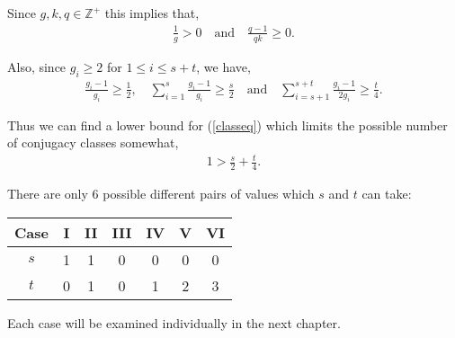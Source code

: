 Since $g,k,q \in \mathbb{Z}^+$ this implies that,
\begin{align*} \frac{1}{g} > 0 \quad \text{and} \quad \frac{q-1}{qk} \geq 0.
\end{align*} 

Also, since $g_i \geq 2$ for $1 \leq i \leq s + t$, we have,
\begin{align*} \frac{g_i-1}{g_i} \geq \frac{1}{2}, \quad \sum_{i=1}^{s} \frac{g_i-1}{g_i} \geq \frac{s}{2} \quad \text{and} \quad \sum_{i=s+1}^{s+t} \frac{g_i-1}{2g_i} \geq \frac{t}{4}.
\end{align*}

Thus we can find a lower bound for (\ref{classeq}) which limits the possible number of conjugacy classes somewhat,
\begin{align*} 1 > \frac{s}{2} + \frac{t}{4}.
\end{align*}

There are only 6 possible different pairs of values which $s$ and $t$ can take: \vspace{3mm}

\begin{center}
\centering
  \begin{tabular}{||c||c|c|c|c|c|c||}
\hline
Case & I & II & III & IV & V & VI \\ [1ex]
\hline\hline
 $s$ & 1 & 1 & 0 & 0 & 0 & 0 \\ [1ex]
\hline
$t$ & 0 & 1 & 0 & 1 & 2 & 3 \\ [1ex]
 \hline
\end{tabular}
\end{center}
\vspace{2mm}

Each case will be examined individually in the next chapter.